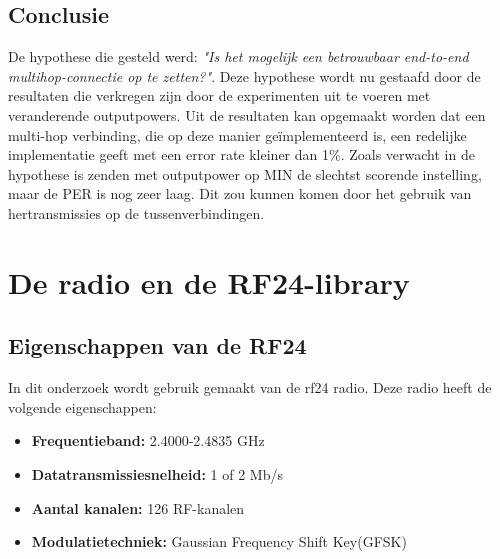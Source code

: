 \documentclass{article}
\begin{document}
\subsection{Conclusie}

De hypothese die gesteld werd: \textit{"Is het mogelijk een betrouwbaar end-to-end multihop-connectie op te zetten?"}.
Deze hypothese wordt nu gestaafd door de resultaten die verkregen zijn door de experimenten uit te voeren met veranderende outputpowers. 
Uit de resultaten kan opgemaakt worden dat een multi-hop verbinding, die op deze manier ge\"{i}mplementeerd is, een redelijke implementatie geeft met een error rate kleiner dan 1\%. Zoals verwacht in de hypothese is zenden met outputpower op MIN de slechtst scorende instelling, maar de PER is nog zeer laag. Dit zou kunnen komen door het gebruik van hertransmissies op de tussenverbindingen.

\clearpage





\newpage
\appendix
\section{De radio en de RF24-library}
\subsection{Eigenschappen van de RF24}
In dit onderzoek wordt gebruik gemaakt van de rf24 radio. Deze radio heeft de volgende eigenschappen:
	\begin{itemize}	
	\item\textbf{Frequentieband: }2.4000-2.4835 GHz
	\item\textbf{Datatransmissiesnelheid: }1 of 2 Mb/s
	\item\textbf{Aantal kanalen: }126 RF-kanalen
	\item\textbf{Modulatietechniek: }Gaussian Frequency Shift Key(GFSK)
	\end{itemize}
	
\end{document}
